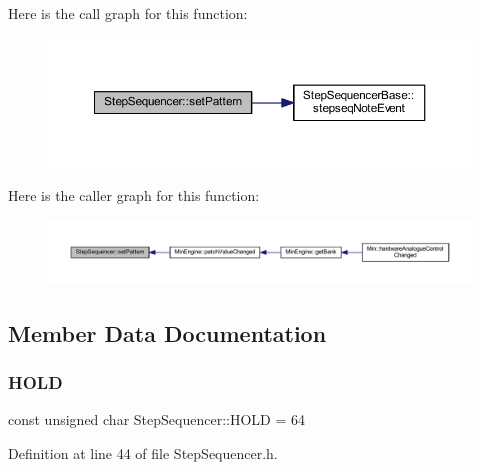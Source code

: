 Here is the call graph for this function\+:
\nopagebreak
\begin{figure}[H]
\begin{center}
\leavevmode
\includegraphics[width=350pt]{class_step_sequencer_ac611afad54d4336977925b7f3495e8b4_cgraph}
\end{center}
\end{figure}
Here is the caller graph for this function\+:
\nopagebreak
\begin{figure}[H]
\begin{center}
\leavevmode
\includegraphics[width=350pt]{class_step_sequencer_ac611afad54d4336977925b7f3495e8b4_icgraph}
\end{center}
\end{figure}


\subsection{Member Data Documentation}
\mbox{\label{class_step_sequencer_ac1b02d103d79f819639067c5ef5e6803}} 
\subsubsection{\texorpdfstring{H\+O\+LD}{HOLD}}
{\footnotesize\ttfamily const unsigned char Step\+Sequencer\+::\+H\+O\+LD = 64\hspace{0.3cm}{\ttfamily [static]}}



Definition at line 44 of file Step\+Sequencer.\+h.

\mbox{\label{class_step_sequencer_a2bba012830137ec08afb83cf5da1d799}} 
